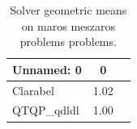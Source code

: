 \begin{table}
\caption{Solver geometric means on maros meszaros problems problems.}
\label{t-maros meszaros problems-geom_mean}
\begin{tabular}{lcc}
\toprule
Unnamed: 0 & 0 \\
\midrule
Clarabel & 1.02 \\
QTQP_qdldl & 1.00 \\
\bottomrule
\end{tabular}
\end{table}
